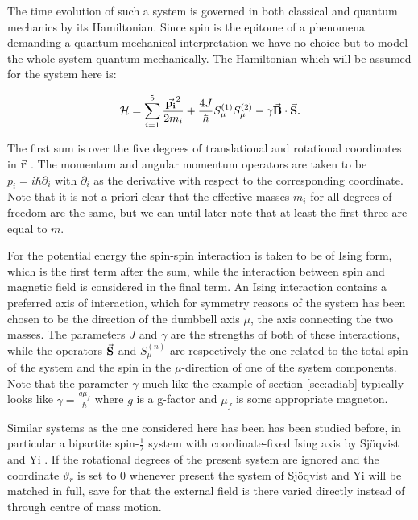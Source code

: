 \documentclass[a4paper]{article}
\begin{document}
The time evolution of such a system is governed in both classical and quantum mechanics by
its Hamiltonian. Since spin is the epitome of a phenomena demanding a quantum mechanical
interpretation we have no choice but to model the whole system quantum mechanically. %
The Hamiltonian which will be assumed for the system here is:

\begin{equation}\label{eq:Hamil0}
        \mathbb{\cal H} = \sum_{i=1}^{5} \frac{\va{p_i}^2}{2m_i} +
        \frac{4J}{\hbar{}}S^{(1)}_{\mu}S^{(2)}_{\mu} -
        \gamma\va{B}\cdot \va{S}.
\end{equation}

The first sum is over the five degrees of translational and rotational coordinates in \(\va{r}\)
. The momentum and angular
momentum operators are
taken to be \(p_i = i\hbar \partial_i\label{def:mom}\) with \(\partial_i\) as the derivative with respect
to the
corresponding coordinate. Note that it is not a priori clear that the effective masses
\(m_i\) for
all degrees of freedom are the same, but we can until later note that at least the first
three are equal to \(m\).

For the potential energy the spin-spin interaction is taken to be of Ising form, which is
the first term after the sum, while the interaction between spin and magnetic field is
considered in the final term. %
An Ising interaction contains a preferred axis of interaction, which for symmetry reasons
of the system has been chosen to be the direction of the dumbbell axis \(\mu\), the axis connecting
the two masses.
 The parameters \(J\) and \(\gamma\) are the strengths of both
of these interactions, while the operators \(\va{S}\) and \(S^{(n)}_{\mu}\) are respectively
the one
related to the total spin of the system and the spin in the \(\mu\)-direction of one of the
system
components. Note that the parameter \(\gamma\) much like the example of section
\ref{sec:adiab} typically looks like \(\gamma = \frac{g\mu_f}{\hbar{}}\) where \(g\) is a
g-factor and \(\mu _f\) is some appropriate magneton.

Similar systems as the one considered here has been has been studied before, in particular
a bipartite spin-\(\frac{1}{2}\) system with coordinate-fixed Ising axis by Sjöqvist and Yi
\cite{yi}. If the rotational degrees of the present system are ignored and the coordinate
\(\vartheta_r\) is set to \(0\) whenever present the system of Sjöqvist and Yi will be
matched in full, save for that the external field is there varied directly instead of
through centre of mass motion.
\end{document}
